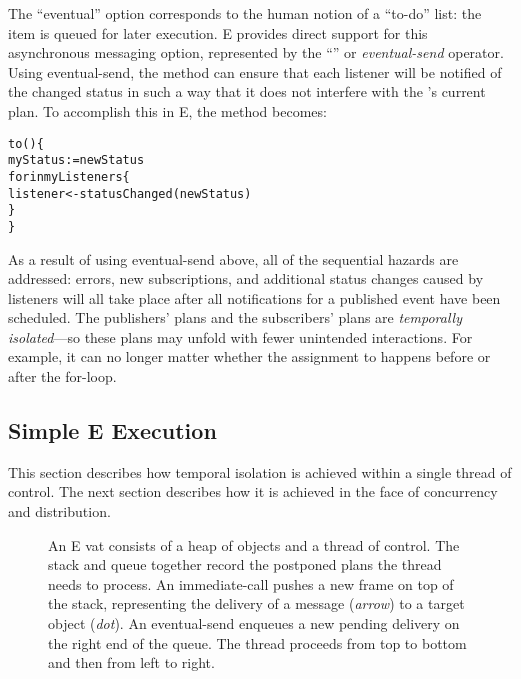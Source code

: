 \documentclass{llncs}
\begin{document}
The ``eventual'' option corresponds to the human notion of a ``to-do''
list: the item is queued for later execution. E provides direct
support for this asynchronous messaging option, represented by the
``\code{<-}'' or \emph{eventual-send} operator. Using eventual-send,
the  method can ensure that each listener will be
notified of the changed status in such a way that it does not
interfere with the 's current plan.  To accomplish
this in E, the  method becomes:
%
\begin{alltt}
    to () \{
        myStatus := newStatus
        for  in myListeners \{
            listener <- statusChanged(newStatus)
        \}
    \}
\end{alltt}
%
As a result of using eventual-send above, all of the sequential
hazards are addressed: errors, new subscriptions, and additional
status changes caused by listeners will all take place after all
notifications for a published event have been scheduled.  The
publishers' plans and the subscribers' plans are \emph{temporally
isolated}---so these plans may unfold with fewer unintended
interactions. For example, it can no longer matter whether the
assignment to  happens before or after the for-loop.

\subsection{Simple E Execution}

This section describes how temporal isolation is achieved within a
single thread of control.  The next section describes how it is
achieved in the face of concurrency and distribution.

\begin{figure}
\centerline{}
\caption{An E vat consists of a heap of objects and a thread of
  control. The stack and queue together record the postponed plans the
  thread needs to process. An immediate-call pushes a new frame on top
  of the stack, representing the delivery of a message ({\it arrow})
  to a target object ({\it dot}). An eventual-send enqueues a new
  pending delivery on the right end of the queue. The thread proceeds
  from top to bottom and then from left to right.
%
}
\label{fig:stackvat}
\end{figure}
\end{document}
